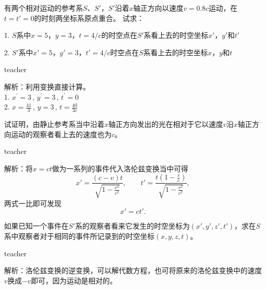 \begin{example}
有两个相对运动的参考系$S$、$S'$，$S'$沿着$x$轴正方向以速度$v=0.8c$运动，在$t = t'=0$的时刻两坐标系原点重合。
试求：

1. $S$系中$x=5$，$y=3$，$t=4/c$的时空点在$S'$系看上去的时空坐标$x'$，$y'$和$t'$

2. $S'$系中$x'=5$，$y'=3$，$t' = 4/c$时空点在$S$系看上去的时空坐标$x$，$y$和$t$

\begin{taggedblock}{teacher}
\noindent

解析：利用变换直接计算。\\
1. $x^\prime = 3\, ,\, y^\prime = 3\, , \, t^\prime = 0$\\
2. $x = \frac{41}{3}\, , \, y = 3\, , \, t = \frac{40}{3c}$
\end{taggedblock}
\end{example}


\begin{example}
试证明，由静止参考系当中沿着$x$轴正方向发出的光在相对于它以速度$v$沿$x$轴正方向运动的观察者看上去的速度也为$c$。
\begin{taggedblock}{teacher}
\noindent

解析：将$x = ct$做为一系列的事件代入洛伦兹变换当中可得
\[ x' = \frac{(c-v)t}{\sqrt{1-\frac{v^2}{c^2}}} ,\qquad t' = \frac{t(1-\frac{v}{c})}{\sqrt{1-\frac{v^2}{c^2}}},\]
两式一比即可发现
\[x' = ct'.\]
\end{taggedblock}
\end{example}



\begin{example}
如果已知一个事件在$S'$系的观察者看来它发生的时空坐标为$(x',y',z',t')$，求在$S$系中观察者对于相同的事件所记录到的时空坐标$(x,y,z,t)$。
\begin{taggedblock}{teacher}
\noindent

解析：洛伦兹变换的逆变换，可以解代数方程，也可将原来的洛伦兹变换中的速度$v$换成$-v$即可，因为运动是相对的。
\end{taggedblock}
\end{example}



